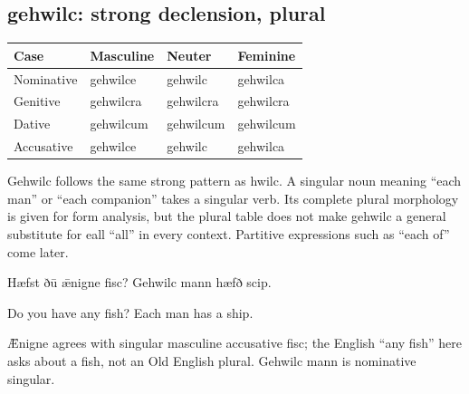 \subsection*{gehwilc: strong declension, plural}

\par\begingroup
\fontsize{10.5}{13.2}\selectfont
\setlength{\LTleft}{0pt}\setlength{\LTright}{\fill}
\noindent
\begin{tabular}{@{}>{\raggedright\arraybackslash}p{28.89mm}>{\raggedright\arraybackslash}p{28.89mm}>{\raggedright\arraybackslash}p{28.89mm}>{\raggedright\arraybackslash}p{28.89mm}@{}}
\toprule
\textbf{Case} & \textbf{Masculine} & \textbf{Neuter} & \textbf{Feminine} \\
\midrule
Nominative & gehwilce & gehwilc & gehwilca \\
Genitive & gehwilcra & gehwilcra & gehwilcra \\
Dative & gehwilcum & gehwilcum & gehwilcum \\
Accusative & gehwilce & gehwilc & gehwilca \\
\bottomrule
\end{tabular}
\par\endgroup

Gehwilc follows the same strong pattern as hwilc. A singular noun meaning “each man” or “each companion” takes a singular verb. Its complete plural morphology is given for form analysis, but the plural table does not make gehwilc a general substitute for eall “all” in every context. Partitive expressions such as “each of” come later.

Hæfst ðū ǣnigne fisc? Gehwilc mann hæfð scip.

Do you have any fish? Each man has a ship.

Ǣnigne agrees with singular masculine accusative fisc; the English “any fish” here asks about a fish, not an Old English plural. Gehwilc mann is nominative singular.

